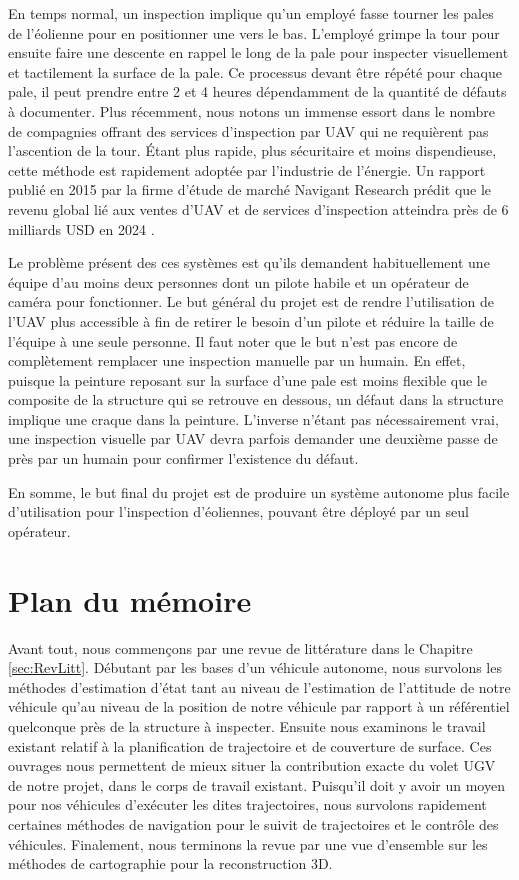 En temps normal, un inspection implique qu'un employé fasse tourner les pales de l'éolienne pour en positionner une vers le bas. L'employé grimpe la tour pour ensuite faire une descente en rappel le long de la pale pour inspecter visuellement et tactilement la surface de la pale. Ce processus devant être répété pour chaque pale, il peut prendre entre 2 et 4 heures dépendamment de la quantité de défauts à documenter. Plus récemment, nous notons un immense essort dans le nombre de compagnies offrant des services d'inspection par UAV qui ne requièrent pas l'ascention de la tour. Étant plus rapide, plus sécuritaire et moins dispendieuse, cette méthode est rapidement adoptée par l'industrie de l'énergie. Un rapport publié en 2015 par la firme d'étude de marché Navigant Research prédit que le revenu global lié aux ventes d'UAV et de services d'inspection atteindra près de 6 milliards USD en 2024 \citep{navigant2015}.

Le problème présent des ces systèmes est qu'ils demandent habituellement une équipe d'au moins deux personnes dont un pilote habile et un opérateur de caméra pour fonctionner. Le but général du projet est de rendre l'utilisation de l'UAV plus accessible à fin de retirer le besoin d'un pilote et réduire la taille de l'équipe à une seule personne. Il faut noter que le but n'est pas encore de complètement remplacer une inspection manuelle par un humain. En effet, puisque la peinture reposant sur la surface d'une pale est moins flexible que le composite de la structure qui se retrouve en dessous, un défaut dans la structure implique une craque dans la peinture. L'inverse n'étant pas nécessairement vrai, une inspection visuelle par UAV devra parfois demander une deuxième passe de près par un humain pour confirmer l'existence du défaut.

En somme, le but final du projet est de produire un système autonome plus facile d'utilisation pour l'inspection d'éoliennes, pouvant être déployé par un seul opérateur.

\section{Plan du mémoire}

Avant tout, nous commençons par une revue de littérature dans le Chapitre \ref{sec:RevLitt}. Débutant par les bases d'un véhicule autonome, nous survolons les méthodes d'estimation d'état tant au niveau de l'estimation de l'attitude de notre véhicule qu'au niveau de la position de notre véhicule par rapport à un référentiel quelconque près de la structure à inspecter. Ensuite nous examinons le travail existant relatif à la planification de trajectoire et de couverture de surface. Ces ouvrages nous permettent de mieux situer la contribution exacte du volet UGV de notre projet, dans le corps de travail existant. Puisqu'il doit y avoir un moyen pour nos véhicules d'exécuter les dites trajectoires, nous survolons rapidement certaines méthodes de navigation pour le suivit de trajectoires et le contrôle des véhicules. Finalement, nous terminons la revue par une vue d'ensemble sur les méthodes de cartographie pour la reconstruction 3D.

